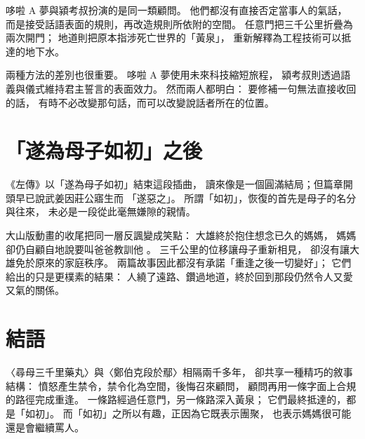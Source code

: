 \documentclass{ntu-minimal-thesis}
\begin{document}
哆啦 A 夢與潁考叔扮演的是同一類顧問。
他們都沒有直接否定當事人的氣話，
而是接受話語表面的規則，再改造規則所依附的空間。
任意門把三千公里折疊為兩次開門；
地道則把原本指涉死亡世界的「黃泉」，
重新解釋為工程技術可以抵達的地下水。

兩種方法的差別也很重要。
哆啦 A 夢使用未來科技縮短旅程，
潁考叔則透過語義與儀式維持君主誓言的表面效力。
然而兩人都明白：
要修補一句無法直接收回的話，
有時不必改變那句話，而可以改變說話者所在的位置。

\section{「遂為母子如初」之後}

《左傳》以「遂為母子如初」結束這段插曲，
讀來像是一個圓滿結局；但篇章開頭早已說武姜因莊公寤生而
「遂惡之」。
所謂「如初」，恢復的首先是母子的名分與往來，
未必是一段從此毫無嫌隙的親情。

大山版動畫的收尾把同一層反諷變成笑點：
大雄終於抱住想念已久的媽媽，
媽媽卻仍自顧自地說要叫爸爸教訓他 \citep{oyama1981}。
三千公里的位移讓母子重新相見，
卻沒有讓大雄免於原來的家庭秩序。
兩篇故事因此都沒有承諾「重逢之後一切變好」；
它們給出的只是更樸素的結果：
人繞了遠路、鑽過地道，終於回到那段仍然令人又愛又氣的關係。

\section{結語}

〈尋母三千里藥丸〉與〈鄭伯克段於鄢〉相隔兩千多年，
卻共享一種精巧的敘事結構：
憤怒產生禁令，禁令化為空間，後悔召來顧問，
顧問再用一條字面上合規的路徑完成重逢。
一條路經過任意門，另一條路深入黃泉；
它們最終抵達的，都是「如初」。
而「如初」之所以有趣，正因為它既表示團聚，
也表示媽媽很可能還是會繼續罵人。

\printthesisbibliography
\end{document}
